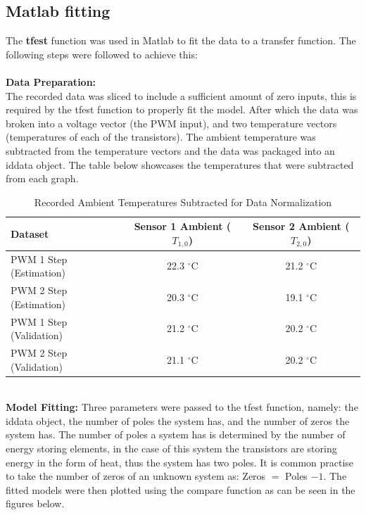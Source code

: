 \subsection{Matlab fitting}
The \textbf{tfest} function was used in Matlab to fit the data to a transfer function. The following steps were followed to achieve this:
\\
\\
\textbf{Data Preparation:}
\\
The recorded data was sliced to include a sufficient amount of zero inputs, this is required by the tfest function to properly fit the model. After which the data was broken into a voltage vector (the PWM input), and two temperature vectors 
(temperatures of each of the transistors). The ambient temperature was subtracted from  the temperature vectors and the data was packaged into an iddata object. The table below showcases the temperatures that were subtracted from each graph.
\begin{table}[htbp]
    \centering
    \renewcommand{\arraystretch}{1.3} %
    \caption{Recorded Ambient Temperatures Subtracted for Data Normalization}
    \label{tab:ambient_temperatures}
    \begin{tabular}{lcc}
        \hline
        \textbf{Dataset} & \textbf{Sensor 1 Ambient ($T_{1,0}$)} & \textbf{Sensor 2 Ambient ($T_{2,0}$)} \\
        \hline
        PWM 1 Step (Estimation) & 22.3 $^\circ$C & 21.2 $^\circ$C \\
        PWM 2 Step (Estimation) & 20.3 $^\circ$C & 19.1 $^\circ$C \\
        PWM 1 Step (Validation) & 21.2 $^\circ$C & 20.2 $^\circ$C \\
        PWM 2 Step (Validation) & 21.1 $^\circ$C & 20.2 $^\circ$C \\
        \hline
    \end{tabular}
\end{table}
\\
\textbf{Model Fitting:}
Three parameters were passed to the tfest function, namely: the iddata object, the number of poles the system has, and the number of zeros the system has.
The number of poles a system has is determined by the number of energy storing elements, in the case of this system the transistors are storing energy in the form
of heat, thus the system has two poles. It is common practise to take the number of zeros of an unknown system as: Zeros $=$ Poles $- 1$. 
The fitted models were then plotted using the compare function as can be seen in the figures below.



